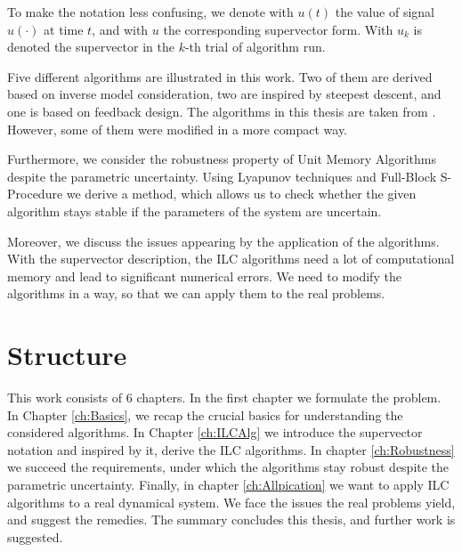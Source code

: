 To make the notation less confusing, we denote with $u(t)$ the value of signal $u(\cdot)$ at time $t$, and with $u$ the corresponding supervector form. With $u_k$ is denoted the supervector in the $k$-th trial of algorithm run.

Five different algorithms are illustrated in this work. Two of them are derived based on inverse model consideration, two are inspired by steepest descent, and one is based on feedback design. The algorithms in this thesis are taken from \cite{ILC}. However, some of them were modified in a more compact way.

Furthermore, we consider the robustness property of Unit Memory Algorithms despite the parametric uncertainty. Using Lyapunov techniques and 
Full-Block S-Procedure we derive a method, which allows us to check whether the given algorithm stays stable if the parameters of the system are uncertain. 

Moreover, we discuss the issues appearing by the application of the algorithms. With the supervector description, the ILC algorithms need a lot of computational memory and lead to significant numerical errors. We need to modify the algorithms in a way, so that we can apply them to the real problems.

\section{Structure}

This work consists of 6 chapters. In the first chapter we formulate the problem.
In Chapter \ref{ch:Basics}, we recap the crucial basics for understanding the considered algorithms. In Chapter \ref{ch:ILCAlg}  we introduce the supervector notation and inspired by it, derive the ILC algorithms. In chapter \ref{ch:Robustness} we succeed the requirements, under which the algorithms stay robust despite the parametric uncertainty. Finally, in chapter \ref{ch:Allpication} we want to apply ILC algorithms to a real dynamical system. We face the issues the real problems yield, and suggest the remedies. The summary concludes this thesis, and further work is suggested. 










 



 


 


 





 
